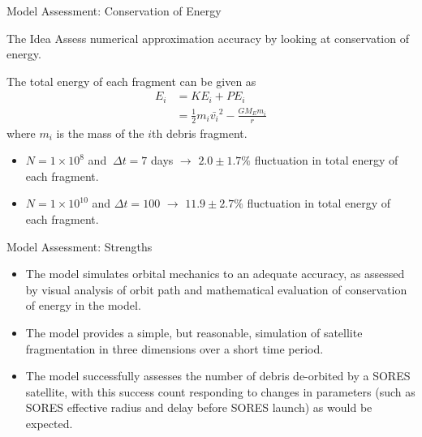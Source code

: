 \documentclass{beamer}
\begin{document}
\begin{frame}{Model Assessment: Conservation of Energy}
\begin{block}{The Idea}
Assess numerical approximation accuracy by looking at conservation of energy.
\end{block}

The total energy of each fragment can be given as 
\begin{align*}
E_{i} 
&= \mathit{KE}_{i} + \mathit{PE}_{i} \\
&= \frac{1}{2} m_{i} \bar{v_{i}}^2 - \frac{G M_{E} m_{i}}{r}
\end{align*}
where $m_{i}$ is the mass of the $i$th debris fragment.

\begin{itemize}
\item $N = 1\times10^{8}$ and $\ \Delta t = 7$ days $\rightarrow$ $2.0 \pm 1.7 \%$ fluctuation in total energy of each fragment.
\item  $N = 1\times10^{10}$ and $\Delta t = 100$ $\rightarrow$ $11.9 \pm 2.7 \%$ fluctuation in total energy of each fragment.
\end{itemize}

\end{frame}


\begin{frame}{Model Assessment: Strengths}

\begin{itemize}
        \item The model simulates orbital mechanics to an adequate accuracy, as assessed by visual analysis of orbit path and mathematical evaluation of conservation of energy in the model.
        \item The model provides a simple, but reasonable, simulation of satellite fragmentation in three dimensions over a short time period.
        \item The model successfully assesses the number of debris de-orbited by a SORES satellite, with this success count responding to changes in parameters (such as SORES effective radius and delay before SORES launch) as would be expected.
    \end{itemize}
    
\end{frame}
\end{document}
